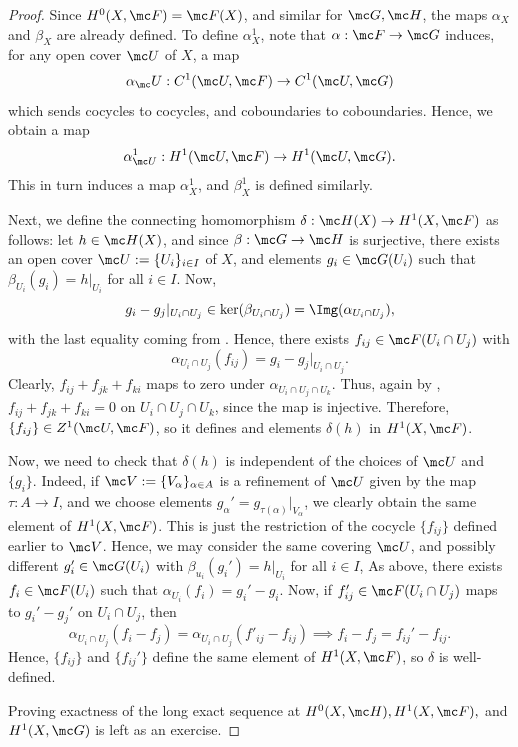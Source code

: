 \documentclass[11pt]{report}
\begin{document}
\begin{proof}
    Since $H^0(X,\mc F)=\mc F(X)$, and similar for $\mc G,\mc H$, the maps $\alpha_X$ and $\beta_X$ are already defined. To define $\alpha^1_X$, note that $\alpha :\mc F \to \mc G$ induces, for any open cover $\mc U$ of $X$, a map
    \[
    \alpha_\mc U : C^1(\mc U, \mc F) \to C^1(\mc U,\mc G)
    \]
    which sends cocycles to cocycles, and coboundaries to coboundaries. Hence, we obtain a map
    \[
    \alpha_{\mc U}^{1}:H^1(\mc U,\mc F) \to H^1(\mc U,\mc G).
    \]
    This in turn induces a map $\alpha^1_X$, and $\beta^1_X$ is defined similarly. 

    Next, we define the connecting homomorphism $\delta : \mc H(X) \to H^1(X, \mc F)$ as follows: let $h \in \mc H(X)$, and since $\beta :\mc G \to \mc H$ is surjective, there exists an open cover $\mc U:=\{U_i\}_{i \in I}$ of $X$, and elements $g_i \in \mc G(U_i)$ such that $\beta_{U_i}(g_i)=h|_{U_i}$ for all $i \in I$. Now,
    \[
    g_i-g_j|_{U_i \cap U_j}\in \ker(\beta_{U_i\cap U_j}) = \Img(\alpha_{U_i \cap U_j}),
    \]
    with the last equality coming from . Hence, there exists $f_{ij}\in \mc F(U_i \cap U_j)$ with
    \[
    \alpha_{U_i \cap U_j}(f_{ij})=g_i - g_j|_{U_i \cap U_j}.
    \]
    Clearly, $f_{ij}+f_{jk}+f_{ki}$ maps to zero under $\alpha_{U_i \cap U_j \cap U_k}$. Thus, again by , $f_{ij}+f_{jk}+f_{ki}=0$ on $U_i \cap U_j \cap U_k$, since the map is injective. Therefore, $\{f_{ij}\} \in Z^1(\mc U,\mc F)$, so it defines and elements $\delta(h)$ in $H^1(X,\mc F)$.

    Now, we need to check that $\delta(h)$ is independent of the choices of $\mc U$ and $\{g_i\}$. Indeed, if $\mc V:= \{V_\alpha\}_{\alpha \in A}$ is a refinement of $\mc U$ given by the map $\tau:A \to I$, and we choose elements $g_\alpha'=g_{\tau(\alpha)}|_{V_\alpha}$, we clearly obtain the same element of $H^1(X,\mc F)$. This is just the restriction of the cocycle $\{f_{ij}\}$ defined earlier to $\mc V$. Hence, we may consider the same covering $\mc U$, and possibly different $g_i' \in \mc G(U_i)$ with $\beta_{u_i}(g_i')=h|_{U_i}$ for all $i \in I$, As above, there exists $f_i \in \mc F(U_i)$ such that $\alpha_{U_i}(f_i)=g_i'-g_i$. Now, if $f_{ij}' \in \mc F(U_i \cap U_j)$ maps to $g_i'-g_j'$ on $U_i \cap U_j$, then
    \[
    \alpha_{U_i \cap U_j}(f_i - f_j)=\alpha_{U_i \cap U_j}(f'_{ij}-f_{ij}) \implies f_i -f_j = f_{ij}' -f_{ij}.
    \]
    Hence, $\{f_{ij}\}$ and $\{f_{ij}'\}$ define the same element of $H^1(X ,\mc F)$, so $\delta$ is well-defined.

    Proving exactness of the long exact sequence at $H^0(X ,\mc H), H^1(X,\mc F),$ and $H^1(X,\mc G)$ is left as an exercise.
\end{proof}
\end{document}
